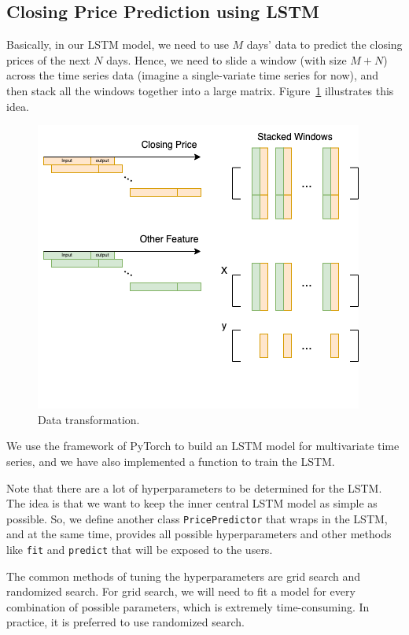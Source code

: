 \documentclass[a4paper, 11pt]{my-elegantpaper}
\begin{document}
\subsection{Closing Price Prediction using LSTM}

Basically, in our LSTM model, we need to use $M$ days' data to predict the closing prices of the next $N$ days. Hence, we need to slide a window (with size $M+N$) across the time series data (imagine a single-variate time series for now), and then stack all the windows together into a large matrix. Figure~\ref{fig:2} illustrates this idea.

\begin{figure}[H]
    \centering
    \includegraphics[scale=0.5]{figures/sliding-window.png}
    \caption{Data transformation.}
    \label{fig:2}
\end{figure}

We use the framework of PyTorch to build an LSTM model for multivariate time series, and we have also implemented a function to train the LSTM.

Note that there are a lot of hyperparameters to be determined for the LSTM. The idea is that we want to keep the inner central LSTM model as simple as possible. So, we define another class \texttt{PricePredictor} that wraps in the LSTM, and at the same time, provides all possible hyperparameters and other methods like \texttt{fit} and \texttt{predict} that will be exposed to the users.

The common methods of tuning the hyperparameters are grid search and randomized search. For grid search, we will need to fit a model for every combination of possible parameters, which is extremely time-consuming. In practice, it is preferred to use randomized search.
\end{document}
